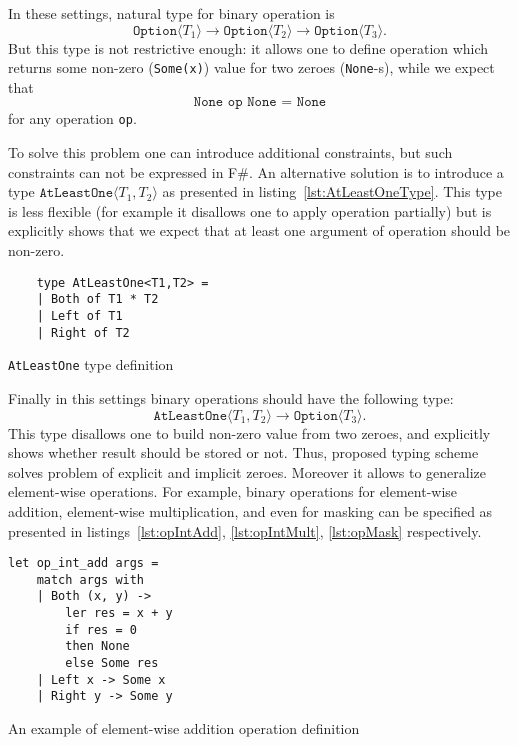 In these settings, natural type for binary operation is $$\texttt{Option}\langle T_1 \rangle \to \texttt{Option}\langle T_2 \rangle \to \texttt{Option}\langle T_3 \rangle.$$ But this type is not restrictive enough: it allows one to define operation which returns some non-zero (\texttt{Some(x)}) value for two zeroes (\texttt{None}-s), while we expect that $$\texttt{None op None = None}$$ for any operation \texttt{op}.   

To solve this problem one can introduce additional constraints, but such constraints can not be expressed in F\#.
An alternative solution is to introduce a type $\texttt{AtLeastOne} \langle T_1, T_2 \rangle$ as presented in listing~\ref{lst:AtLeastOneType}. This type is less flexible (for example it disallows one to apply operation partially) but is explicitly shows that we expect that at least one argument of operation should be non-zero. 

\begin{listing}[h]
    \begin{verbatim}
    type AtLeastOne<T1,T2> =
    | Both of T1 * T2
    | Left of T1
    | Right of T2
    \end{verbatim}
    \caption{\texttt{AtLeastOne} type definition}
    \label{lst:AtLeastOneType}
\end{listing}

Finally in this settings binary operations should have the following type: $$\texttt{AtLeastOne} \langle T_1, T_2 \rangle \to \texttt{Option}\langle T_3 \rangle.$$
This type disallows one to build non-zero value from two zeroes, and explicitly shows whether result should be stored or not.
Thus, proposed typing scheme solves problem of explicit and implicit zeroes.
Moreover it allows to generalize element-wise operations.
For example, binary operations for element-wise addition, element-wise multiplication, and even for masking can be specified as presented in listings~\ref{lst:opIntAdd}, \ref{lst:opIntMult}, \ref{lst:opMask} respectively.

\begin{listing}[h]
    \begin{verbatim}
let op_int_add args =
    match args with
    | Both (x, y) -> 
        ler res = x + y 
        if res = 0 
        then None 
        else Some res 
    | Left x -> Some x
    | Right y -> Some y
    \end{verbatim}
    \caption{An example of element-wise addition operation definition}
    \label{lst:opIntAdd}
\end{listing}

